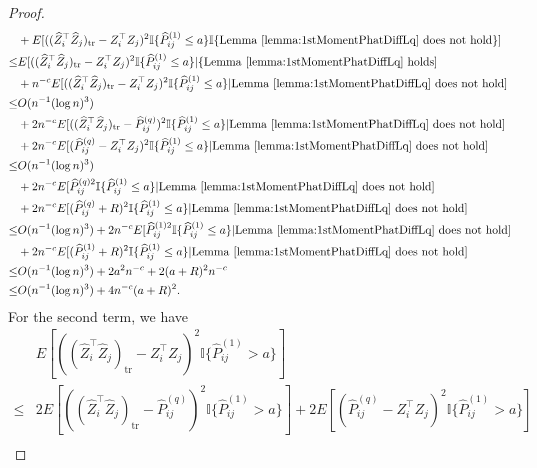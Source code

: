 \begin{proof}
\begin{align*}
	& + E[((\hat{Z}_i^{\top} \hat{Z}_j)_{\mathrm{tr}} - Z_i^{\top} Z_j)^2 \mathbb{I}\{\hat{P}^{(1)}_{ij} \le a\} \mathbb{I}\{\mathrm{Lemma\ } \ref{lemma:1stMomentPhatDiffLq} \mathrm{\ does\ not\ hold}\}] \\
	\le & E[((\hat{Z}_i^{\top} \hat{Z}_j)_{\mathrm{tr}} - Z_i^{\top} Z_j)^2 \mathbb{I}\{\hat{P}^{(1)}_{ij} \le a\} |\{\mathrm{Lemma\ } \ref{lemma:1stMomentPhatDiffLq} \mathrm{\ holds}] \\
	& + n^{-c} E[((\hat{Z}_i^{\top} \hat{Z}_j)_{\mathrm{tr}} - Z_i^{\top} Z_j)^2 \mathbb{I}\{\hat{P}^{(1)}_{ij} \le a\} | \mathrm{Lemma\ } \ref{lemma:1stMomentPhatDiffLq} \mathrm{\ does\ not\ hold}] \\
	\le & O(n^{-1} (\log n)^3) \\
	& + 2 n^{-c} E[((\hat{Z}_i^{\top} \hat{Z}_j)_{\mathrm{tr}} - \hat{P}^{(q)}_{ij})^2 \mathbb{I}\{\hat{P}^{(1)}_{ij} \le a\} | \mathrm{Lemma\ } \ref{lemma:1stMomentPhatDiffLq} \mathrm{\ does\ not\ hold}] \\
	& + 2 n^{-c} E[(\hat{P}^{(q)}_{ij} - Z_i^{\top} Z_j)^2 \mathbb{I}\{\hat{P}^{(1)}_{ij} \le a\} | \mathrm{Lemma\ } \ref{lemma:1stMomentPhatDiffLq} \mathrm{\ does\ not\ hold}] \\
	\le & O(n^{-1} (\log n)^3) \\
	& + 2 n^{-c} E[\hat{P}^{(q)2}_{ij} \mathbb{I}\{\hat{P}^{(1)}_{ij} \le a\} | \mathrm{Lemma\ } \ref{lemma:1stMomentPhatDiffLq} \mathrm{\ does\ not\ hold}] \\
	& + 2 n^{-c} E[(\hat{P}^{(q)}_{ij} + R)^2 \mathbb{I}\{\hat{P}^{(1)}_{ij} \le a\} | \mathrm{Lemma\ } \ref{lemma:1stMomentPhatDiffLq} \mathrm{\ does\ not\ hold}] \\
	\le & O(n^{-1} (\log n)^3)
	+ 2 n^{-c} E[\hat{P}^{(1)2}_{ij} \mathbb{I}\{\hat{P}^{(1)}_{ij} \le a\} | \mathrm{Lemma\ } \ref{lemma:1stMomentPhatDiffLq} \mathrm{\ does\ not\ hold}] \\
	& + 2 n^{-c} E[(\hat{P}^{(1)}_{ij} + R)^2 \mathbb{I}\{\hat{P}^{(1)}_{ij} \le a\} | \mathrm{Lemma\ } \ref{lemma:1stMomentPhatDiffLq} \mathrm{\ does\ not\ hold}] \\
	\le & O(n^{-1} (\log n)^3) + 2 a^2 n^{-c} + 2 (a+R)^2 n^{-c} \\
	\le & O(n^{-1} (\log n)^3) + 4 n^{-c} (a + R)^2.
\end{align*}
For the second term, we have
\begin{align*}
	& E[((\hat{Z}_i^{\top} \hat{Z}_j)_{\mathrm{tr}} - Z_i^{\top} Z_j)^2 \mathbb{I}\{\hat{P}^{(1)}_{ij} > a\}] \\
	\le & 2 E[((\hat{Z}_i^{\top} \hat{Z}_j)_{\mathrm{tr}} - \hat{P}^{(q)}_{ij})^2 \mathbb{I}\{\hat{P}^{(1)}_{ij} > a\}] + 2 E[(\hat{P}^{(q)}_{ij} - Z_i^{\top} Z_j)^2 \mathbb{I}\{\hat{P}^{(1)}_{ij} > a\}] \\

\end{align*}
\end{proof}
